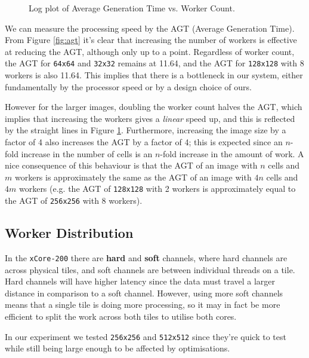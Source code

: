 \documentclass{article}
\begin{document}
    \begin{figure}[h]
        \begin{center}
            
            \caption{Log plot of Average Generation Time vs. Worker Count.}
            \label{fig:agtplot}
        \end{center}
    \end{figure}

    We can measure the processing speed by the AGT (Average Generation Time). From Figure \ref{fig:agt} it's clear that increasing the number of workers is effective at reducing the AGT, although only up to a point. Regardless of worker count, the AGT for \verb|64x64| and \verb|32x32| remains at 11.64, and the AGT for \verb|128x128| with 8 workers is also 11.64. This implies that there is a bottleneck in our system, either fundamentally by the processor speed or by a design choice of ours.

    However for the larger images, doubling the worker count halves the AGT, which implies that increasing the workers gives a \textit{linear} speed up, and this is reflected by the straight lines in Figure \ref{fig:agtplot}. Furthermore, increasing the image size by a factor of 4 also increases the AGT by a factor of 4; this is expected since an $n$-fold increase in the number of cells is an $n$-fold increase in the amount of work. A nice consequence of this behaviour is that the AGT of an image with $n$ cells and $m$ workers is approximately the same as the AGT of an image with $4n$ cells and $4m$ workers (e.g. the AGT of \verb|128x128| with 2 workers is approximately equal to the AGT of \verb|256x256| with 8 workers).

    \subsection{Worker Distribution} 
    \label{workerdistribution}

    In the \verb|xCore-200| there are \textbf{hard} and \textbf{soft} channels, where hard channels are across physical tiles, and soft channels are between individual threads on a tile. Hard channels will have higher latency since the data must travel a larger distance in comparison to a soft channel. However, using more soft channels means that a single tile is doing more processing, so it may in fact be more efficient to split the work across both tiles to utilise both cores.

    In our experiment we tested \verb|256x256| and \verb|512x512| since they're quick to test while still being large enough to be affected by optimisations.
\end{document}
